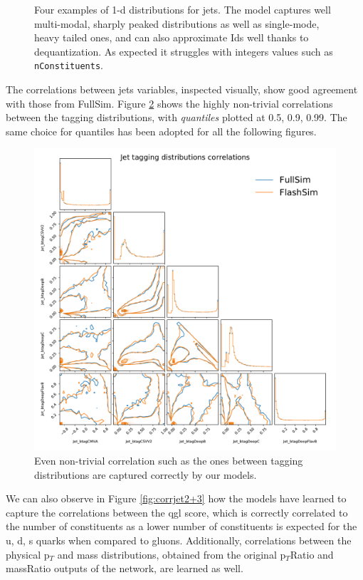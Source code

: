 \begin{figure}
    \caption[1-d jets distributions]{Four examples of 1-d distributions for jets. The model captures well multi-modal, sharply peaked distributions as well as single-mode, heavy tailed ones, and can also approximate Ids well thanks to dequantization. As expected it struggles with integers values such as \texttt{nConstituents}.}\label{fig:jetsdists}
    
\end{figure}

The correlations between jets variables, inspected visually, show good agreement with those from FullSim. Figure \ref{fig:corrjet1} shows the highly non-trivial correlations between the tagging distributions, with \emph{quantiles} plotted at 0.5, 0.9, 0.99. The same choice for quantiles has been adopted for all the following figures.

\begin{figure}
    \centering
    \includegraphics[width=\linewidth]{gfx/ch5/corrjet1.pdf}
    \caption[Tagging correlations]{Even non-trivial correlation such as the ones between tagging distributions are captured correctly by our models.}
    \label{fig:corrjet1}
\end{figure}

We can also observe in Figure \ref{fig:corrjet2+3} how the models have learned to capture the correlations between the qgl score, which is correctly correlated to the number of constituents as a lower number of constituents is expected for the u, d, s quarks when compared to gluons. Additionally, correlations between the physical p$_T$ and mass distributions, obtained from the original p$_T$Ratio and massRatio outputs of the network, are learned as well.

